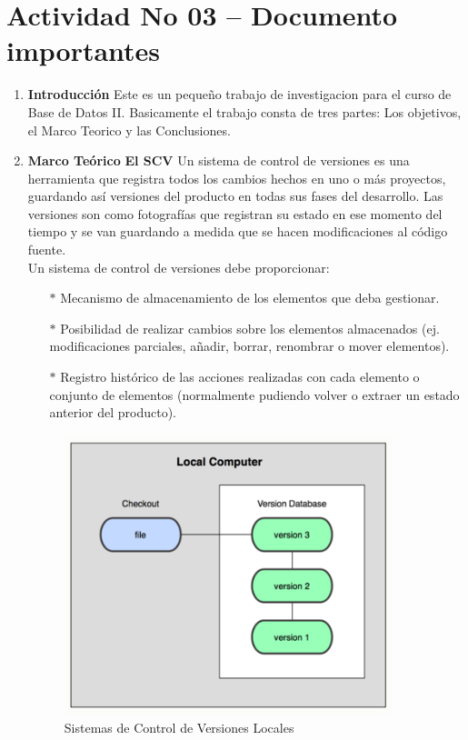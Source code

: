\section{Actividad No 03 – Documento importantes} 
		
\begin{enumerate}
\item \textbf{Introducción}
\newline
Este es un pequeño trabajo de investigacion para el curso de Base de Datos II.
Basicamente el trabajo consta de tres partes: Los objetivos, el Marco Teorico y las Conclusiones. 

\item \textbf{Marco Teórico}
\newline
\textbf{El SCV}
\newline
Un sistema de control de versiones es una herramienta que registra todos los cambios hechos en uno o más proyectos, guardando así versiones del producto en todas sus fases del desarrollo. Las versiones son como fotografías que registran su estado en ese momento del tiempo y se van guardando a medida que se hacen modificaciones al código fuente.
\\Un sistema de control de versiones debe proporcionar:
\begin{itemize}
	\item[$*$] Mecanismo de almacenamiento de los elementos que deba gestionar.
	\item[$*$] Posibilidad de realizar cambios sobre los elementos almacenados (ej. modificaciones parciales, añadir, borrar, renombrar o mover elementos).
	\item[$*$] Registro histórico de las acciones realizadas con cada elemento o conjunto de elementos (normalmente pudiendo volver o extraer un estado anterior del producto).\end{itemize}

\begin{figure}
\begin{center}
  \includegraphics[width=0.9\textwidth]{Imagenes/grafico1.png}
\caption{Sistemas de Control de Versiones Locales}
\end{center}
\end{figure}


\end{enumerate}
